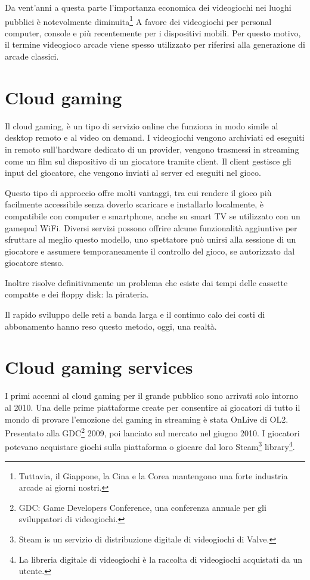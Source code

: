 Da vent'anni a questa parte l'importanza economica dei videogiochi nei luoghi pubblici è notevolmente diminuita\footnote{Tuttavia, il Giappone, la Cina e la Corea mantengono una forte industria arcade ai giorni nostri.} A favore dei videogiochi per personal computer, console e più recentemente per i dispositivi mobili. Per questo motivo, il termine videogioco arcade viene spesso utilizzato per riferirsi alla generazione di arcade classici\cite{High_Score}.

\section{Cloud gaming}
Il cloud gaming, è un tipo di servizio online che funziona in modo simile al desktop remoto e al video on demand. I videogiochi vengono archiviati ed eseguiti in remoto sull'hardware dedicato di un provider, vengono trasmessi in streaming come un film sul dispositivo di un giocatore tramite client. Il client gestisce gli input del giocatore, che vengono inviati al server ed eseguiti nel gioco.

Questo tipo di approccio offre molti vantaggi, tra cui rendere il gioco più facilmente accessibile senza doverlo scaricare e installarlo localmente, è compatibile con computer e smartphone, anche su smart TV se utilizzato con un gamepad WiFi. Diversi servizi possono offrire alcune funzionalità aggiuntive per sfruttare al meglio questo modello, uno spettatore può unirsi alla sessione di un giocatore e assumere temporaneamente il controllo del gioco, se autorizzato dal giocatore stesso.

Inoltre risolve definitivamente un problema che esiste dai tempi delle cassette compatte e dei floppy disk: la pirateria.

Il rapido sviluppo delle reti a banda larga e il continuo calo dei costi di abbonamento hanno reso questo metodo, oggi, una realtà.

\section{Cloud gaming services}
I primi accenni al cloud gaming per il grande pubblico sono arrivati solo intorno al 2010. Una delle prime piattaforme create per consentire ai giocatori di tutto il mondo di provare l'emozione del gaming in streaming è stata OnLive di OL2. Presentato alla GDC\footnote{GDC: Game Developers Conference, una conferenza annuale per gli sviluppatori di videogiochi.} 2009, poi lanciato sul mercato nel giugno 2010. I giocatori potevano acquistare giochi sulla piattaforma o giocare dal loro Steam\footnote{Steam is un servizio di distribuzione digitale di videogiochi di Valve.} library\footnote{La libreria digitale di videogiochi è la raccolta di videogiochi acquistati da un utente.}.

